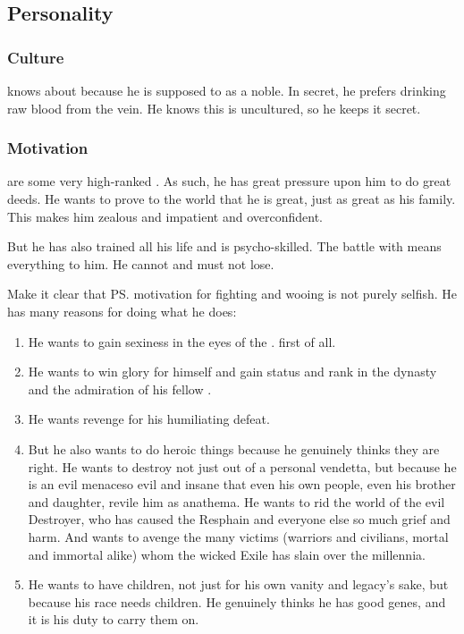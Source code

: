 \subsection{Personality}





\subsubsection{Culture}
\Teshrial{} knows about  because he is supposed to as a noble. 
In secret, he prefers drinking raw blood from the vein. 
He knows this is uncultured, so he keeps it secret. 





\subsubsection{Motivation}
 are some very high-ranked \resphain. 
As such, he has great pressure upon him to do great deeds. 
He wants to prove to the world that he is great, just as great as his family. 
This makes him zealous and impatient and overconfident. 

But he has also trained all his life and is psycho-skilled. 
The battle with \Ishnaruchaefir{} means everything to him. 
He cannot and must not lose. 

Make it clear that \ps{\Teshrial} motivation for fighting \Ishnaruchaefir{} and wooing \Firaxel{} is not purely selfish. 
He has many reasons for doing what he does:

\begin{enumerate}
  \item 
    He wants to gain sexiness in the eyes of the \resviel. 
    \Firaxel{} first of all.
  \item 
    He wants to win glory for himself and gain status and rank in the dynasty and the admiration of his fellow \resphain. 
  \item 
    He wants revenge for his humiliating defeat. 
  \item 
    But he also wants to do heroic things because he genuinely thinks they are right. 
    He wants to destroy \Ishnaruchaefir{} not just out of a personal vendetta, but because he is an evil menace\dash so evil and insane that even his own people, even his brother and daughter, revile him as anathema. 
    He wants to rid the world of the evil Destroyer, who has caused the Resphain and everyone else so much grief and harm. 
    And \Teshrial{} wants to avenge the many victims (warriors and civilians, mortal and immortal alike) whom the wicked Exile has slain over the millennia. 
  \item 
    He wants to have children, not just for his own vanity and legacy's sake, but because his race needs children. 
    He genuinely thinks he has good genes, and it is his duty to carry them on. 
\end{enumerate}

